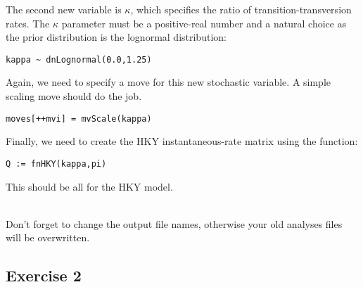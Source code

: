 The second new variable is $\kappa$, which specifies the ratio of transition-transversion rates.
The $\kappa$ parameter must be a positive-real number and a natural choice as the prior distribution is the lognormal distribution:
{\tt \begin{snugshade*}
\begin{lstlisting}
kappa ~ dnLognormal(0.0,1.25)
\end{lstlisting}
\end{snugshade*}}
Again, we need to specify a move for this new stochastic variable.
A simple scaling move should do the job.
{\tt \begin{snugshade*}
\begin{lstlisting}
moves[++mvi] = mvScale(kappa)
\end{lstlisting}
\end{snugshade*}}

Finally, we need to create the HKY instantaneous-rate matrix using the  function:
{\tt \begin{snugshade*}
\begin{lstlisting}
Q := fnHKY(kappa,pi)
\end{lstlisting}
\end{snugshade*}}
This should be all for the HKY model.

\noindent \\ \impmark Don't forget to change the output file names, otherwise your old analyses files will be overwritten.

\subsection{Exercise 2}

